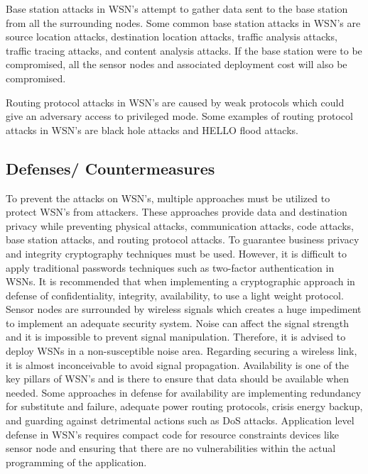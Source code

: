 Base station attacks in WSN’s attempt to gather data sent to the base station from all the surrounding nodes. Some common base station attacks in WSN’s are source location attacks, destination location attacks, traffic analysis attacks, traffic tracing attacks, and content analysis attacks. If the base station were to be compromised, all the sensor nodes and associated deployment cost will also be compromised. 

\smallskip

Routing protocol attacks in WSN’s are caused by weak protocols which could give an adversary access to privileged mode. Some examples of routing protocol attacks in WSN’s are black hole attacks and HELLO flood attacks.

\subsection {Defenses/ Countermeasures}

To prevent the attacks on WSN’s, multiple approaches must be utilized to protect WSN’s from attackers. These approaches provide data and destination privacy while preventing physical attacks, communication attacks, code attacks, base station attacks, and routing protocol attacks. To guarantee business privacy and integrity cryptography techniques must be used. However, it is difficult to apply traditional passwords techniques such as two-factor authentication in WSNs. It is recommended that when implementing a cryptographic approach in defense of confidentiality, integrity, availability, to use a light weight protocol. Sensor nodes are surrounded by wireless signals which creates a huge impediment to implement an adequate security system. Noise can affect the signal strength and it is impossible to prevent signal manipulation. Therefore, it is advised to deploy WSNs in a non-susceptible noise area. Regarding securing a wireless link, it is almost inconceivable to avoid signal propagation. Availability is one of the key pillars of WSN’s and is there to ensure that data should be available when needed. Some approaches in defense for availability are implementing redundancy for substitute and failure, adequate power routing protocols, crisis energy backup, and guarding against detrimental actions such as DoS attacks. Application level defense in WSN’s requires compact code for resource constraints devices like sensor node and ensuring that there are no vulnerabilities within the actual programming of the application. 

